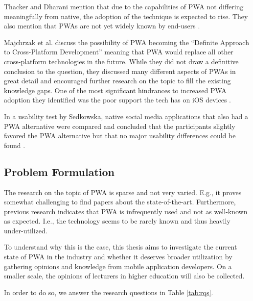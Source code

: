 \documentclass[a4paper,12pt]{article}
\begin{document}
Thacker and Dharani mention that due to the capabilities of PWA not differing meaningfully from native, the adoption of the technique is expected to rise. They also mention that PWAs are not yet widely known by end-users \cite{realize_native_with_pwa}.

Majchrzak et al. discuss the possibility of PWA becoming the “Definite Approach to Cross-Platform Development” meaning that PWA would replace all other cross-platform technologies in the future. While they did not draw a definitive conclusion to the question, they discussed many different aspects of PWAs in great detail and encouraged further research on the topic to fill the existing knowledge gaps. One of the most significant hindrances to increased PWA adoption they identified was the poor support the tech has on iOS devices \cite{pwa_definite_approach}.

In a usability test by Sedkowska, native social media applications that also had a PWA alternative were compared and concluded that the participants slightly favored the PWA alternative but that no major usability differences could be found \cite{thesis_pwa_ux}.

\subsection{Problem Formulation}
\label{Intro_problem}
The research on the topic of PWA is sparse and not very varied. E.g., it proves somewhat challenging to find papers about the state-of-the-art. Furthermore, previous research indicates that PWA is infrequently used and not as well-known as expected. I.e., the technology seems to be rarely known and thus heavily under-utilized.

To understand why this is the case, this thesis aims to investigate the current state of PWA in the industry and whether it deserves broader utilization by gathering opinions and knowledge from mobile application developers. On a smaller scale, the opinions of lecturers in higher education will also be collected. 

In order to do so, we answer the research questions in Table \ref{tab:rqs}.
\end{document}
